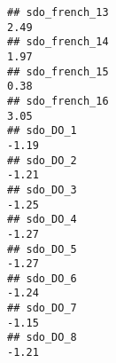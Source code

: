 \documentclass[
]{article}
\begin{document}
\begin{verbatim}
## sdo_french_13                                                                                                                                                                                                                  2.49
## sdo_french_14                                                                                                                                                                                                                  1.97
## sdo_french_15                                                                                                                                                                                                                  0.38
## sdo_french_16                                                                                                                                                                                                                  3.05
## sdo_DO_1                                                                                                                                                                                                                      -1.19
## sdo_DO_2                                                                                                                                                                                                                      -1.21
## sdo_DO_3                                                                                                                                                                                                                      -1.25
## sdo_DO_4                                                                                                                                                                                                                      -1.27
## sdo_DO_5                                                                                                                                                                                                                      -1.27
## sdo_DO_6                                                                                                                                                                                                                      -1.24
## sdo_DO_7                                                                                                                                                                                                                      -1.15
## sdo_DO_8                                                                                                                                                                                                                      -1.21

\end{verbatim}
\end{document}
